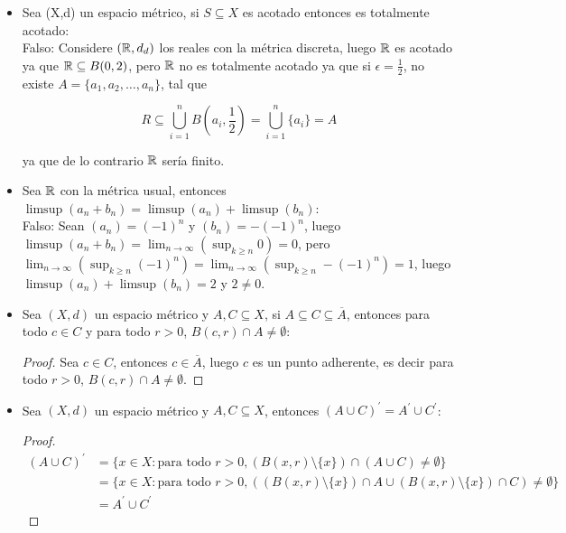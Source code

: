 \begin{itemize}[leftmargin=*]

\item Sea (X,d) un espacio métrico, si $S\subseteq X$ es acotado entonces es totalmente acotado:\\

Falso: Considere $(\mathbb{R},d_d)$ los reales con la métrica discreta, luego $\mathbb{R}$ es acotado ya que $\mathbb{R}\subseteq B(0,2)$, pero $\mathbb{R}$ no es totalmente acotado ya que si $\epsilon=\frac{1}{2}$, no existe $A=\{a_1,a_2,\ldots,a_n\}$, tal que 

$$R\subseteq \bigcup_{i=1}^nB\left(a_i,\frac{1}{2}\right)=\bigcup_{i=1}^n\{a_i\} 
    =A 
    $$

    ya que de lo contrario $\mathbb{R}$ sería finito.


\item Sea $\mathbb{R}$ con la métrica usual, entonces $\limsup(a_n+b_n)=\limsup(a_n)+\limsup(b_n)$:\\

Falso: Sean $(a_n)=(-1)^n$ y $(b_n)=-(-1)^n$, luego $\limsup(a_n+b_n)=\lim _{n \rightarrow \infty}\left(\sup _{k \geq n} 0\right)=0$, pero $\lim _{n \rightarrow \infty}\left(\sup _{k \geq n} (-1)^n\right)=\lim _{n \rightarrow \infty}\left(\sup _{k \geq n} -(-1)^n\right)=1$, luego $\limsup(a_n)+\limsup(b_n)=2$ y $2\neq 0$.

\item Sea $(X,d)$ un espacio métrico y $A,C\subseteq X$, si $A\subseteq C\subseteq \overline{A}$, entonces para todo $c\in C$ y para todo $r>0$, $B(c,r)\cap A\neq \emptyset$:\\

\begin{proof}
Sea $c\in C$, entonces $c\in \overline{A}$, luego $c$ es un punto adherente, es decir para todo $r>0$, $B(c,r)\cap A\neq \emptyset$.
\end{proof}

\item Sea $(X,d)$ un espacio métrico y $A,C\subseteq X$, entonces $(A\cup C)^{\prime}=A^{\prime}\cup C^{\prime}$:\\

\begin{proof}

\begin{align*}
(A\cup C)^{\prime}&=\{x\in X: \text{para todo }r>0, (B(x,r)\setminus \{x\})\cap (A\cup C)\neq \emptyset\}\\
&=\{x\in X: \text{para todo }r>0, ((B(x,r)\setminus \{x\})\cap A \cup (B(x,r)\setminus \{x\})\cap C) \neq \emptyset\}\\
&=A^{\prime}\cup C^{\prime}
\end{align*}


\end{proof}
\end{itemize}
